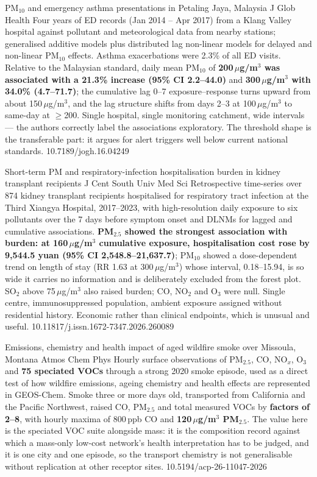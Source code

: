\documentclass[10pt]{article}
\begin{document}
{PM$_{10}$ and emergency asthma presentations in Petaling Jaya, Malaysia}
{J Glob Health}
{Four years of ED records (Jan 2014 -- Apr 2017) from a Klang Valley hospital against
pollutant and meteorological data from nearby stations; generalised additive models plus
distributed lag non-linear models for delayed and non-linear PM$_{10}$ effects. Asthma
exacerbations were 2.3\% of all ED visits. Relative to the Malaysian standard, daily mean
PM$_{10}$ of \textbf{200\,$\mu$g/m$^3$ was associated with a 21.3\% increase
(95\% CI 2.2--44.0)} and \textbf{300\,$\mu$g/m$^3$ with 34.0\% (4.7--71.7)}; the cumulative
lag 0--7 exposure--response turns upward from about 150\,$\mu$g/m$^3$, and the lag
structure shifts from days 2--3 at 100\,$\mu$g/m$^3$ to same-day at $\geq$200. Single
hospital, single monitoring catchment, wide intervals --- the authors correctly label the
associations exploratory. The threshold shape is the transferable part: it argues for
alert triggers well below current national standards.}
{10.7189/jogh.16.04249}

{Short-term PM and respiratory-infection hospitalisation burden in kidney transplant recipients}
{J Cent South Univ Med Sci}
{Retrospective time-series over 874 kidney transplant recipients hospitalised for
respiratory tract infection at the Third Xiangya Hospital, 2017--2023, with high-resolution
daily exposure to six pollutants over the 7 days before symptom onset and DLNMs for
lagged and cumulative associations. \textbf{PM$_{2.5}$ showed the strongest association
with burden: at 160\,$\mu$g/m$^3$ cumulative exposure, hospitalisation cost rose by
9{,}544.5 yuan (95\% CI 2{,}548.8--21{,}637.7)}; PM$_{10}$ showed a dose-dependent trend on
length of stay (RR 1.63 at 300\,$\mu$g/m$^3$) whose interval, 0.18--15.94, is so wide it
carries no information and is deliberately excluded from the forest plot. SO$_2$ above
75\,$\mu$g/m$^3$ also raised burden; CO, NO$_2$ and O$_3$ were null. Single centre,
immunosuppressed population, ambient exposure assigned without residential history.
Economic rather than clinical endpoints, which is unusual and useful.}
{10.11817/j.issn.1672-7347.2026.260089}


{Emissions, chemistry and health impact of aged wildfire smoke over Missoula, Montana}
{Atmos Chem Phys}
{Hourly surface observations of PM$_{2.5}$, CO, NO$_x$, O$_3$ and \textbf{75 speciated
VOCs} through a strong 2020 smoke episode, used as a direct test of how wildfire emissions,
ageing chemistry and health effects are represented in GEOS-Chem. Smoke three or more days
old, transported from California and the Pacific Northwest, raised CO, PM$_{2.5}$ and total
measured VOCs by \textbf{factors of 2--8}, with hourly maxima of 800\,ppb CO and
\textbf{120\,$\mu$g/m$^3$ PM$_{2.5}$}. The value here is the speciated VOC suite alongside
mass: it is the composition record against which a mass-only low-cost network's health
interpretation has to be judged, and it is one city and one episode, so the transport
chemistry is not generalisable without replication at other receptor sites.}
{10.5194/acp-26-11047-2026}
\end{document}
